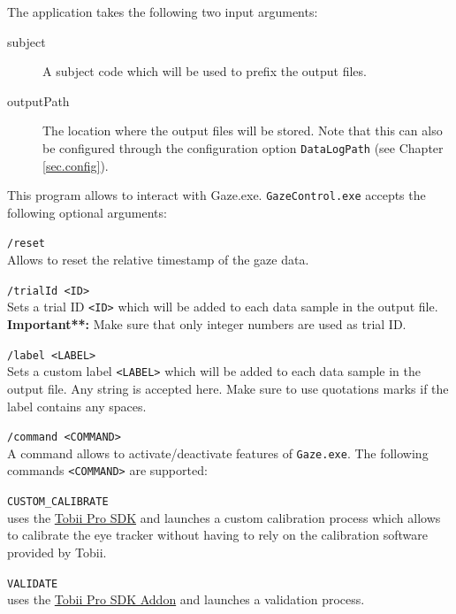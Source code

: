 \documentclass[a4paper,oneside]{book}
\begin{document}
\begin{description}
        The application takes the following two input arguments:
        \begin{description}
            \item[subject]
                A subject code which will be used to prefix the output files.
            \item[outputPath]
                The location where the output files will be stored.
                Note that this can also be configured through the configuration option \texttt{DataLogPath} (see Chapter \ref{sec.config}).
        \end{description}
    \item[GazeControl.exe] This program allows to interact with Gaze.exe.
        \texttt{GazeControl.exe} accepts the following optional arguments:
        \begin{description}
            \item{\texttt{/reset}\\} Allows to reset the relative timestamp of the gaze data.
            \item{\texttt{/trialId <ID>}\\} Sets a trial ID \texttt{<ID>} which will be added to each data sample in the output file.
                \textbf{Important**:} Make sure that only integer numbers are used as trial ID.
            \item{\texttt{/label <LABEL>}\\} Sets a custom label \texttt{<LABEL>} which will be added to each data sample in the output file.
                Any string is accepted here. Make sure to use quotations marks if the label contains any spaces.
            \item{\texttt{/command <COMMAND>\\} A command allows to activate/deactivate features of \texttt{Gaze.exe}.
                    The following commands \texttt{<COMMAND>} are supported:
                \begin{description}
                    \item{\texttt{CUSTOM\_CALIBRATE}\\} uses the \href{http://developer.tobii.com/tobii-pro-sdk/}{Tobii Pro SDK} and launches a custom calibration process which allows to calibrate the eye tracker without having to rely on the calibration software provided by Tobii.
                    \item{\texttt{VALIDATE}\\} uses the \href{https://github.com/tobiipro/prosdk-addons-dotnet/}{Tobii Pro SDK Addon} and launches a validation process.

\end{description}}
\end{description}
\end{description}
\end{document}
